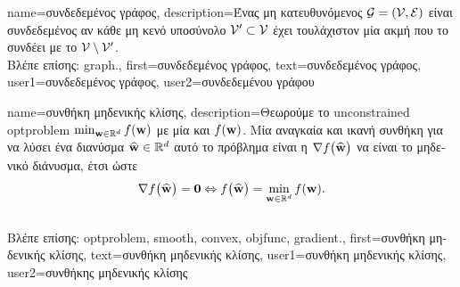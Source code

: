 {name={\foreignlanguage{greek}{συνδεδεμένος γράφος}}, 
	description={\foreignlanguage{greek}{Ένας μη κατευθυνόμενος} 
		 $\mathcal{G}=\left( \mathcal{V},\mathcal{E} \right)$ \foreignlanguage{greek}{είναι συνδεδεμένος αν κάθε μη κενό υποσύνολο  
		$\mathcal{V}' \subset \mathcal{V}$ έχει τουλάχιστον μία ακμή που το συνδέει με το} $\mathcal{V} \setminus \mathcal{V}'$.\\
		\foreignlanguage{greek}{Βλέπε επίσης:} \gls{graph}.}, 
	first={\foreignlanguage{greek}{συνδεδεμένος γράφος}},
	text={\foreignlanguage{greek}{συνδεδεμένος γράφος}},
	user1={\foreignlanguage{greek}{συνδεδεμένος γράφος}}, %
	user2={\foreignlanguage{greek}{συνδεδεμένου γράφου}} %
}

{name={\foreignlanguage{greek}{συνθήκη μηδενικής κλίσης}},
	description={\foreignlanguage{greek}{Θεωρούμε το}  unconstrained 
		\gls{optproblem} $\min_{{\bf w} \in \mathbb{R}^{d}} f({\bf w})$ \foreignlanguage{greek}{με μία} 
		 \foreignlanguage{greek}{και}   $f({\bf w})$. 
		\foreignlanguage{greek}{Μία αναγκαία και ικανή συνθήκη για να λύσει ένα διανύσμα $\widehat{{\bf w}} \in \mathbb{R}^{d}$ 
		αυτό το πρόβλημα είναι η}  $\nabla f \big( \widehat{{\bf w}} \big)$ 
		\foreignlanguage{greek}{να είναι το μηδενικό διάνυσμα, έτσι ώστε} 
		$$\nabla f \big( \widehat{{\bf w}} \big) = \mathbf{0} \Leftrightarrow  f \big( \widehat{{\bf w}} \big) = \min_{{\bf w} \in \mathbb{R}^{d}} f({\bf w}).$$\\
		\foreignlanguage{greek}{Βλέπε επίσης:} \gls{optproblem}, \gls{smooth}, \gls{convex}, \gls{objfunc}, \gls{gradient}.}, 
	first={\foreignlanguage{greek}{συνθήκη μηδενικής κλίσης}},
	text={\foreignlanguage{greek}{συνθήκη μηδενικής κλίσης}},
	user1={\foreignlanguage{greek}{συνθήκη μηδενικής κλίσης}}, %
	user2={\foreignlanguage{greek}{συνθήκης μηδενικής κλίσης}} %
}

